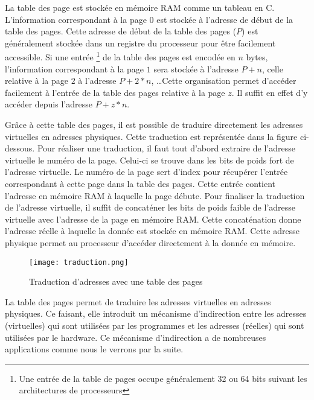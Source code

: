 La table des page est stockée en mémoire RAM comme un tableau en C.
L'information correspondant à la page $0$ est stockée à l'adresse
de début de la table des pages. Cette adresse de début de la table des
pages ($P$) est généralement stockée dans un registre du processeur
pour être facilement accessible. Si une entrée \footnote{Une entrée de
la table de pages occupe généralement 32 ou 64 bits suivant les
architectures de processeurs} de la table
des pages est encodée en $n$ bytes, l'information correspondant à la
page $1$ sera stockée à l'adresse $P + n$, celle relative à la page
$2$ à l'adresse $P+2*n$, \ldots Cette organisation permet
d'accéder facilement à l'entrée de la table des pages relative à la
page $z$. Il suffit en effet d'y accéder depuis l'adresse $P+z*n$.
 
Grâce à cette table des pages, il est possible de traduire directement
les adresses virtuelles en adresses physiques. Cette traduction est
représentée dans la figure ci-dessous. Pour réaliser une traduction, il
faut tout d'abord extraire de l'adresse virtuelle le numéro de la page.
Celui-ci se trouve dans les bits de poids fort de l'adresse virtuelle.
Le numéro de la page sert d'index pour récupérer l'entrée correspondant
à cette page dans la table des pages. Cette entrée contient l'adresse
en mémoire RAM à laquelle la page débute. Pour finaliser la traduction
de l'adresse virtuelle, il suffit de concaténer les bits de poids
faible de l'adresse virtuelle avec l'adresse de la page en mémoire RAM.
Cette concaténation donne l'adresse réelle à laquelle la donnée est
stockée en mémoire RAM. Cette adresse physique permet au processeur
d'accéder directement à la donnée en mémoire. \newline
 
\begin{figure}[!ht]
    \centering
    \texttt{[image: traduction.png]}
    \caption{Traduction d'adresses avec une table des pages}
\end{figure}
  
La table des pages permet de traduire les adresses virtuelles en
adresses physiques. Ce faisant, elle introduit un mécanisme
d'indirection entre les adresses (virtuelles) qui sont utilisées par
les programmes et les adresses (réelles) qui sont utilisées par le
hardware. Ce mécanisme d'indirection a de nombreuses applications
comme nous le verrons par la suite.\newline
  
